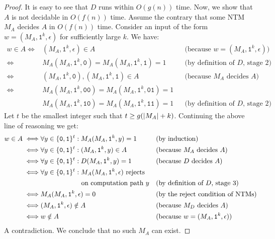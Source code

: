 \documentclass[11pt,twoside=off,numbers=noenddot]{scrbook}
\begin{document}
\begin{proof}
  It is easy to see that $D$ runs within $O(g(n))$ time. Now, we show that $A$ is not decidable in $O(f(n))$ time. Assume the contrary that some NTM $M_A$ decides $A$ in $O(f(n))$ time. Consider an input of the form $w = (M_A, \texttt{1}^k, \epsilon)$ for sufficiently large $k$. We have:
  \begin{align*}
    w \in A \iff & (M_A, \texttt{1}^k, \epsilon) \in A && \text{(because $w = (M_A, \texttt{1}^k, \epsilon)$)} \\
    \iff & M_A(M_A, \texttt{1}^k, \texttt{0}) = M_A(M_A, \texttt{1}^k, \texttt{1}) = 1 && \text{(by definition of $D$, stage 2)} \\
    \iff & (M_A, \texttt{1}^k, \texttt{0}), (M_A, \texttt{1}^k, \texttt{1}) \in A && \text{(because $M_A$ decides $A$)} \\
    \iff & M_A(M_A, \texttt{1}^k, \texttt{0}\texttt{0}) = M_A(M_A, \texttt{1}^k, \texttt{0}\texttt{1}) = 1 \\
    & M_A(M_A, \texttt{1}^k, \texttt{1}\texttt{0}) = M_A(M_A, \texttt{1}^k, \texttt{1}\texttt{1}) = 1 && \text{(by definition of $D$, stage 2)}
  \end{align*}
  Let $t$ be the smallest integer such that $t \geq g(| M_A | + k)$. Continuing the above line of reasoning we get:
  \begin{align*}
    w \in A \iff & \forall y \in \set{\texttt{0}, \texttt{1}}^t : M_A(M_A, \texttt{1}^k, y) = 1 && \text{(by induction)} \\
    \iff & \forall y \in \set{\texttt{0}, \texttt{1}}^t : (M_A, \texttt{1}^k, y) \in A && \text{(because $M_A$ decides $A$)} \\
    \iff & \forall y \in \set{\texttt{0}, \texttt{1}}^t : D(M_A, \texttt{1}^k, y) = 1 && \text{(because $D$ decides $A$)} \\
    \iff & \forall y \in \set{\texttt{0}, \texttt{1}}^t : \text{$M_A(M_A, \texttt{1}^k, \epsilon)$ rejects} \\
    & \phantom{\forall y \in \set{\texttt{0}, \texttt{1}}^t :} \ \text{on computation path $y$} && \text{(by definition of $D$, stage 3)} \\
    \iff & M_A(M_A, \texttt{1}^k, \epsilon) = 0 && \text{(by the reject condition of NTMs)} \\
    \iff & (M_A, \texttt{1}^k, \epsilon) \notin A && \text{(because $M_D$ decides $A$)} \\
    \iff & w \notin A && \text{(because $w = (M_A, \texttt{1}^k, \epsilon)$)}
  \end{align*}
  A contradiction. We conclude that no such $M_A$ can exist.
\end{proof}
\end{document}
